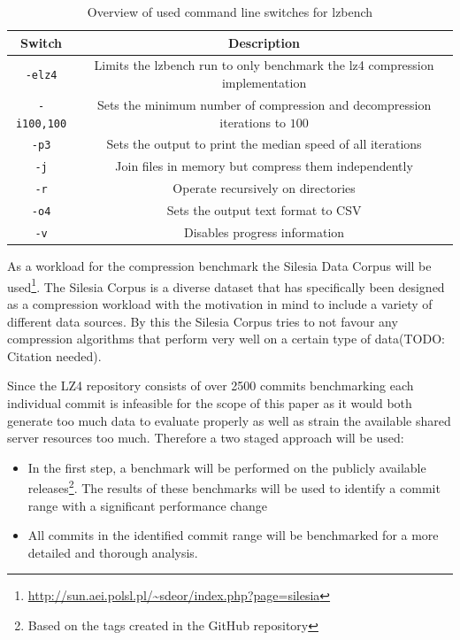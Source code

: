 \documentclass[	runningheads,
				a4paper]{llncs}
\begin{document}
	\begin{table}
		\caption{Overview of used command line switches for lzbench}
		\label{tab:cmd_switches}
		\centering
		\begin{tabular}{|c|c|}
			\hline
			\textbf{Switch} & \textbf{Description}\\
			\hline\hline
			\texttt{-elz4} & Limits the lzbench run to only benchmark the lz4 compression implementation \\
			\hline
			\texttt{-i100,100} & Sets the minimum number of compression and decompression iterations to $100$ \\
			\hline
			\texttt{-p3} & Sets the output to print the median speed of all iterations \\
			\hline
			\texttt{-j} & Join files in memory but compress them independently \\
			\hline
			\texttt{-r} & Operate recursively on directories \\
			\hline 
			\texttt{-o4} & Sets the output text format to CSV \\
			\hline
			\texttt{-v} & Disables progress information \\
			\hline
		\end{tabular}
	\end{table}
	
	As a workload for the compression benchmark the Silesia Data Corpus will be used\footnote{\url{http://sun.aei.polsl.pl/~sdeor/index.php?page=silesia}}. The Silesia Corpus is a diverse dataset that has specifically been designed as a compression workload with the motivation in mind to include a variety of different data sources. By this the Silesia Corpus tries to not favour any compression algorithms that perform very well on a certain type of data(TODO: Citation needed).

Since the LZ4 repository consists of over 2500 commits benchmarking each individual commit is infeasible for the scope of this paper as it would both generate too much data to evaluate properly as well as strain the available shared server resources too much. Therefore a two staged approach will be used:
\begin{itemize}
	\item In the first step, a benchmark will be performed on the publicly available releases\footnote{Based on the tags created in the GitHub repository}. The results of these benchmarks will be used to identify a commit range with a significant performance change
	\item All commits in the identified commit range will be benchmarked for a more detailed and thorough analysis.
\end{itemize}
\end{document}
